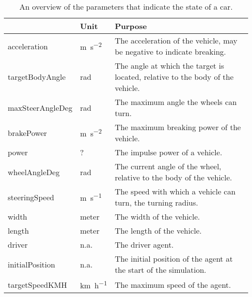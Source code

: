 \begin{table}
		\centering
		\begin{tabularx}{\textwidth}{>{\ttfamily}llX}
			\toprule
			\normalfont{Parameter}	&Unit & Purpose \\ 
			\midrule
			acceleration 			
				& \si{\meter\per\square\second} 
				& The acceleration of the vehicle, may be negative to indicate breaking.\\ 
			targetBodyAngle 		
				& \si{\radian}
				& The angle at which the target is located, relative to the body of the vehicle. \\ 
			maxSteerAngleDeg 		
				& \si{\radian}
				& The maximum angle the wheels can turn. \\
			brakePower 		
				& \si{\meter\per\square\second} 
				& The maximum breaking power of the vehicle. \\				
			power 					
				& \si{?}
				& The impulse power of a vehicle. \\ 
			wheelAngleDeg 			
				& \si{\radian}
				& The current angle of the wheel, relative to the body of the vehicle. \\ 
			steeringSpeed 			
				& \si{\meter\per\second}
				& The speed with which a vehicle can turn, the turning radius. \\  
			width 					
				& \si{meter} 
				& The width of the vehicle. \\ 
			length 					
				& \si{meter} 
				& The length of the vehicle. \\ 
			driver 					
				& n.a. 
				& The driver agent. \\ 
			initialPosition 		
				& n.a.
				& The initial position of the agent at the start of the simulation. \\ 
			targetSpeedKMH			
				& \si{\kilo\meter\per\hour}
				& The maximum speed of the agent. \\ 
			\bottomrule
		\end{tabularx}
		\caption{An overview of the parameters that indicate the state of a car.}
		\label{tab:par:method:model:overview:state:lowlevel:car}
	\end{table}

